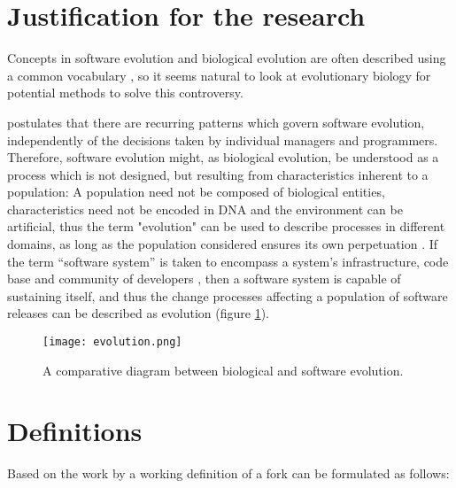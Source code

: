 
\section{Justification for the research}

Concepts in software evolution and biological evolution are often described using a common vocabulary \citep{Yu2006a}, so it seems natural to look at evolutionary biology for potential methods to solve this controversy.

\citet{Lehman1980a} postulates that there are recurring patterns which govern software evolution, independently of the decisions taken by individual managers and programmers. Therefore, software evolution might, as biological evolution, be understood as a process which is not designed, but resulting from characteristics inherent to a population: A population need not be composed of biological entities, characteristics need not be encoded in DNA and the environment can be artificial, thus the term "evolution" can be used to describe processes in different domains, as long as the population considered ensures its own perpetuation \citep{Nehaniv2006a}. If the term “software system” is taken to encompass a system's infrastructure, code base and community of developers \citep{Yu2006a}, then a software system is capable of sustaining itself, and thus the change processes affecting a population of software releases can be described as evolution (figure \ref{fig:evolution}).

\begin{figure}[H]
  \texttt{[image: evolution.png]}
  \caption{A comparative diagram between biological and software evolution.}
  \label{fig:evolution}
\end{figure}


\section{Definitions}

Based on the work by \citet{Robles2012a} a working definition of a fork can be formulated as follows:


